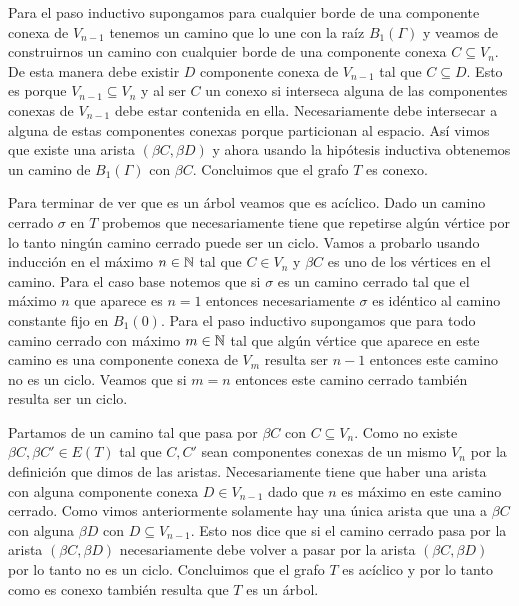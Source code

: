 \documentclass[tesis.tex]{subfiles}
\begin{document}
\begin{ej}
	Para el paso inductivo supongamos para cualquier borde de una componente conexa de $V_{n-1}$ tenemos un camino que lo une con la raíz $B_1(\Gamma)$ y veamos de construirnos un camino con cualquier borde de una componente conexa $C \subseteq V_n$.
	De esta manera debe existir $D$ componente conexa de $V_{n-1}$ tal que $C \subseteq D$. Esto es porque $V_{n-1} \subseteq V_{n}$ y al ser $C$ un conexo si interseca alguna de las componentes conexas de $V_{n-1}$ debe estar contenida en ella. 
	Necesariamente debe intersecar a alguna de estas componentes conexas porque particionan al espacio.
	Así vimos que existe una arista $(\beta C, \beta D)$ y ahora usando la hipótesis inductiva obtenemos un camino de $B_1(\Gamma)$ con $\beta C$.
	Concluimos que el grafo $T$ es conexo.   
	
	Para terminar de ver que es un árbol veamos que es acíclico. 
	Dado un camino cerrado $\sigma$ en $T$ probemos que necesariamente tiene que repetirse algún vértice por lo tanto ningún camino cerrado puede ser un ciclo. Vamos a probarlo usando inducción en el máximo $n \in \mathbb N$ tal que $C \in V_n$ y $\beta C$ es uno de los vértices en el camino. 
	Para el caso base notemos que si $\sigma$ es un camino cerrado tal que el máximo $n$ que aparece es $n=1$ entonces necesariamente $\sigma$ es idéntico al camino constante fijo en $B_1(0)$.
	Para el paso inductivo supongamos que para todo camino cerrado con máximo $m \in \mathbb N$ tal que algún vértice que aparece en este camino es una componente conexa de $V_m$ resulta ser $n-1$ entonces este camino no es un ciclo. Veamos que si $m=n$ entonces este camino cerrado también resulta ser un ciclo.
	
	Partamos de un camino tal que pasa por $\beta C$ con $C \subseteq V_n$. 
	Como no existe $\beta C, \beta C' \in E(T)$ tal que $C,C'$ sean componentes conexas de un mismo $V_n$ por la definición que dimos de las aristas. 
	Necesariamente tiene que haber una arista con alguna componente conexa $D \in V_{n-1}$ dado que $n$ es máximo en este camino cerrado.   
	Como vimos anteriormente solamente hay una única arista que una a $\beta C$ con alguna $\beta D$ con $D \subseteq V_{n-1}$. 
	Esto nos dice que si el camino cerrado pasa por la arista $(\beta C, \beta D)$ necesariamente debe volver a pasar por la arista $(\beta C, \beta D)$ por lo tanto no es un ciclo. 
	Concluimos que el grafo $T$ es acíclico y por lo tanto como es conexo también resulta que $T$ es un árbol.
	

\end{ej}
\end{document}
